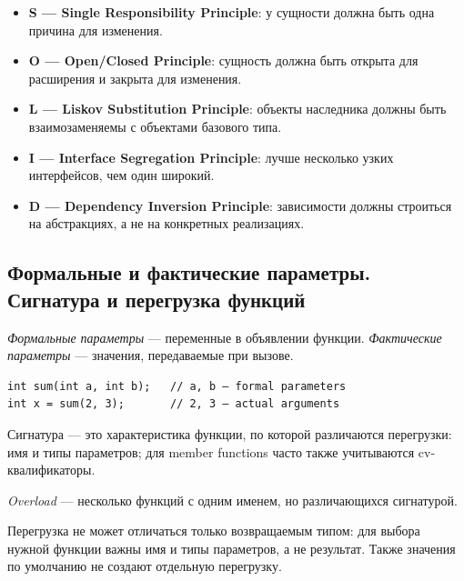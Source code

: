 \begin{itemize}
    \item \textbf{S — Single Responsibility Principle}: у сущности должна быть одна причина для изменения.
    \item \textbf{O — Open/Closed Principle}: сущность должна быть открыта для расширения и закрыта для изменения.
    \item \textbf{L — Liskov Substitution Principle}: объекты наследника должны быть взаимозаменяемы с объектами базового типа.
    \item \textbf{I — Interface Segregation Principle}: лучше несколько узких интерфейсов, чем один широкий.
    \item \textbf{D — Dependency Inversion Principle}: зависимости должны строиться на абстракциях, а не на конкретных реализациях.
\end{itemize}

\subsection{Формальные и фактические параметры. Сигнатура и перегрузка функций}
\begin{definition}
\textit{Формальные параметры} — переменные в объявлении функции.  
\textit{Фактические параметры} — значения, передаваемые при вызове.
\end{definition}

\begin{example}
\begin{verbatim}
int sum(int a, int b);   // a, b — formal parameters
int x = sum(2, 3);       // 2, 3 — actual arguments
\end{verbatim}
\end{example}

\begin{definition}
Сигнатура — это характеристика функции, по которой различаются перегрузки: имя и типы параметров; для member functions часто также учитываются cv-квалификаторы.
\end{definition}

\begin{definition}[Перегрузка]
\textit{Overload} — несколько функций с одним именем, но различающихся сигнатурой.
\end{definition}

\begin{remark}
Перегрузка не может отличаться только возвращаемым типом: для выбора нужной функции важны имя и типы параметров, а не результат. Также значения по умолчанию не создают отдельную перегрузку.
\end{remark}

